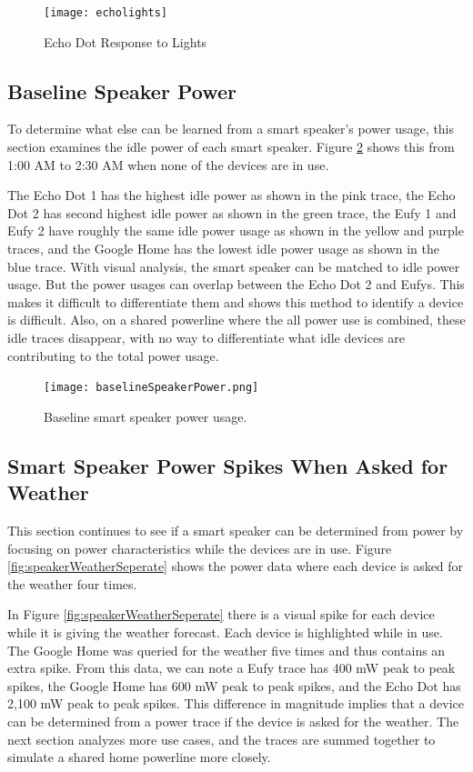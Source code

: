 \begin{figure}[H]
    \centering
    \texttt{[image: echolights]}
    \caption{Echo Dot Response to Lights}
    \label{fig:echolights}
\end{figure}

\subsection{Baseline Speaker Power}
\label{Baseline Speaker Power}
To determine what else can be learned from a smart speaker's power usage, this section examines the idle power of each smart speaker. Figure \ref{fig:baselineSpeakerPower} shows this from 1:00 AM to 2:30 AM when none of the devices are in use.

The Echo Dot 1 has the highest idle power as shown in the pink trace, the Echo Dot 2 has second highest idle power as shown in the green trace, the Eufy 1 and Eufy 2 have roughly the same idle power usage as shown in the yellow and purple traces, and the Google Home has the lowest idle power usage as shown in the blue trace. With visual analysis, the smart speaker can be matched to idle power usage. But the power usages can overlap between the Echo Dot 2 and Eufys. This makes it difficult to differentiate them and shows this method to identify a device is difficult. Also, on a shared powerline where the all power use is combined, these idle traces disappear, with no way to differentiate what idle devices are contributing to the total power usage.

\begin{figure}[H]
    \centering
    \texttt{[image: baselineSpeakerPower.png]}
    \caption{Baseline smart speaker power usage.}
    \label{fig:baselineSpeakerPower}
\end{figure}

\subsection{Smart Speaker Power Spikes When Asked for Weather}
\label{Smart Speaker Power Spikes When Asked for Weather}
This section continues to see if a smart speaker can be determined from power by focusing on power characteristics while the devices are in use. Figure \ref{fig:speakerWeatherSeperate} shows the power data where each device is asked for the weather four times.

In Figure \ref{fig:speakerWeatherSeperate} there is a visual spike for each device while it is giving the weather forecast. Each device is highlighted while in use. The Google Home was queried for the weather five times and thus contains an extra spike. From this data, we can note a Eufy trace has 400 mW peak to peak spikes, the Google Home has 600 mW peak to peak spikes, and the Echo Dot has 2,100 mW peak to peak spikes. This difference in magnitude implies that a device can be determined from a power trace if the device is asked for the weather. The next section analyzes more use cases, and the traces are summed together to simulate a shared home powerline more closely.

